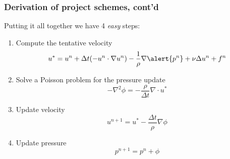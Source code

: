 \begin{frame}
\frametitle{Derivation of project schemes, cont'd}
Putting it all together we have 4 \emph{easy} steps: 
\begin{enumerate}
\item Compute the tentative velocity 
\[   
u^{*} = u^n + \Delta t ( -u^n \cdot \nabla u^n)
    -\frac{1}{\rho}\nabla \alert{p^n}  + \nu \Delta u^n + f^n 
\]
\item Solve a Poisson problem for the pressure update 
\[
-\nabla^2 \phi =  - \frac{\rho}{\Delta t} \nabla \cdot u^*  
\]

\item Update velocity
\[
u^{n+1} =  u^*- \frac{\Delta t}{\rho} \nabla \phi 
\]

\item Update pressure
\[
p^{n+1} = p^n + \phi 
\]
\end{enumerate}
\end{frame}
